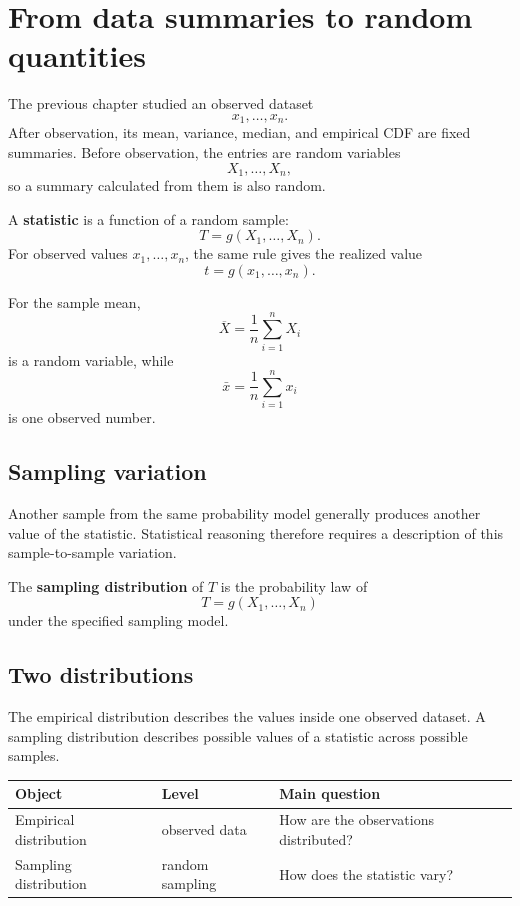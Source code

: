 \section{From data summaries to random quantities}

The previous chapter studied an observed dataset
\[
x_1,\ldots,x_n.
\]
After observation, its mean, variance, median, and empirical CDF are fixed
summaries. Before observation, the entries are random variables
\[
X_1,\ldots,X_n,
\]
so a summary calculated from them is also random.

\begin{definitionbox}
A \textbf{statistic} is a function of a random sample:
\[
T=g(X_1,\ldots,X_n).
\]
For observed values \(x_1,\ldots,x_n\), the same rule gives the realized value
\[
t=g(x_1,\ldots,x_n).
\]
\end{definitionbox}

For the sample mean,
\[
\overline X=\frac1n\sum_{i=1}^nX_i
\]
is a random variable, while
\[
\bar x=\frac1n\sum_{i=1}^n x_i
\]
is one observed number.

\subsection*{Sampling variation}

Another sample from the same probability model generally produces another value
of the statistic. Statistical reasoning therefore requires a description of this
sample-to-sample variation.

\begin{definitionbox}
The \textbf{sampling distribution} of \(T\) is the probability law of
\[
T=g(X_1,\ldots,X_n)
\]
under the specified sampling model.
\end{definitionbox}

\subsection*{Two distributions}

The empirical distribution describes the values inside one observed dataset. A
sampling distribution describes possible values of a statistic across possible
samples.

\begin{center}
\begin{tabular}{lll}
\toprule
Object & Level & Main question \\
\midrule
Empirical distribution & observed data & How are the observations distributed? \\
Sampling distribution & random sampling & How does the statistic vary? \\
\bottomrule
\end{tabular}
\end{center}


